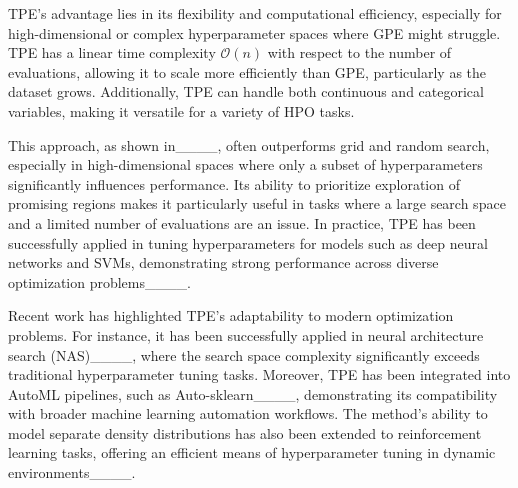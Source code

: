 TPE’s advantage lies in its flexibility and computational efficiency, especially for high-dimensional or complex hyperparameter spaces where GPE might struggle. TPE has a linear time complexity $\mathcal{O}(n)$ with respect to the number of evaluations, allowing it to scale more efficiently than GPE, particularly as the dataset grows. Additionally, TPE can handle both continuous and categorical variables, making it versatile for a variety of HPO tasks.

This approach, as shown in____, often outperforms grid and random search, especially in high-dimensional spaces where only a subset of hyperparameters significantly influences performance. Its ability to prioritize exploration of promising regions makes it particularly useful in tasks where a large search space and a limited number of evaluations are an issue. In practice, TPE has been successfully applied in tuning hyperparameters for models such as deep neural networks and SVMs, demonstrating strong performance across diverse optimization problems____.

Recent work has highlighted TPE's adaptability to modern optimization problems. For instance, it has been successfully applied in neural architecture search (NAS)____, where the search space complexity significantly exceeds traditional hyperparameter tuning tasks. Moreover, TPE has been integrated into AutoML pipelines, such as Auto-sklearn____, demonstrating its compatibility with broader machine learning automation workflows. The method's ability to model separate density distributions has also been extended to reinforcement learning tasks, offering an efficient means of hyperparameter tuning in dynamic environments____.